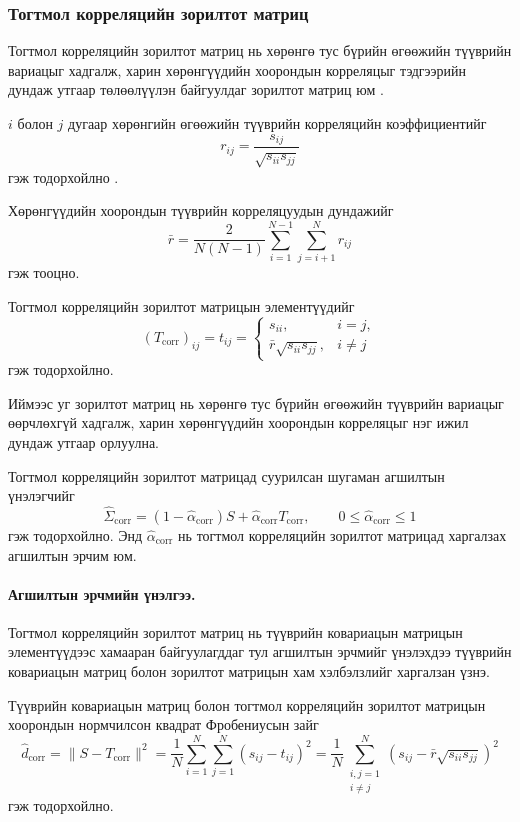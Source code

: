 \subsubsection{Тогтмол корреляцийн зорилтот матриц}

Тогтмол корреляцийн зорилтот матриц нь хөрөнгө тус бүрийн
өгөөжийн түүврийн вариацыг хадгалж, харин хөрөнгүүдийн
хоорондын корреляцыг тэдгээрийн дундаж утгаар
төлөөлүүлэн байгуулдаг зорилтот матриц юм
\citep{ledoitwolf2004a}.

$i$ болон $j$ дугаар хөрөнгийн өгөөжийн
түүврийн корреляцийн коэффициентийг
\[
r_{ij}
=
\frac{s_{ij}}{\sqrt{s_{ii}s_{jj}}}
\]
гэж тодорхойлно \citep{ledoitwolf2004a}.

Хөрөнгүүдийн хоорондын түүврийн
корреляцуудын дундажийг
\[
\bar r
=
\frac{2}{N(N-1)}
\sum_{i=1}^{N-1}
\sum_{j=i+1}^{N}r_{ij}
\]
гэж тооцно.

Тогтмол корреляцийн зорилтот матрицын
элементүүдийг
\[
(T_{\mathrm{corr}})_{ij}
=
t_{ij}
=
\begin{cases}
	s_{ii}, & i=j,\\
	\bar r\sqrt{s_{ii}s_{jj}}, & i\neq j
\end{cases}
\]
гэж тодорхойлно.

Иймээс уг зорилтот матриц нь хөрөнгө тус бүрийн
өгөөжийн түүврийн вариацыг өөрчлөхгүй хадгалж,
харин хөрөнгүүдийн хоорондын корреляцыг
нэг ижил дундаж утгаар орлуулна.

Тогтмол корреляцийн зорилтот матрицад
суурилсан шугаман агшилтын үнэлэгчийг
\[
\widehat{\Sigma}_{\mathrm{corr}}
=
(1-\widehat{\alpha}_{\mathrm{corr}})S
+
\widehat{\alpha}_{\mathrm{corr}}T_{\mathrm{corr}},
\qquad
0\leq\widehat{\alpha}_{\mathrm{corr}}\leq1
\]
гэж тодорхойлно. Энд
$\widehat{\alpha}_{\mathrm{corr}}$ нь тогтмол
корреляцийн зорилтот матрицад харгалзах
агшилтын эрчим юм.

\paragraph{Агшилтын эрчмийн үнэлгээ.}

Тогтмол корреляцийн зорилтот матриц нь
түүврийн ковариацын матрицын элементүүдээс
хамааран байгуулагддаг тул агшилтын
эрчмийг үнэлэхдээ түүврийн ковариацын
матриц болон зорилтот матрицын
хам хэлбэлзлийг харгалзан үзнэ.

Түүврийн ковариацын матриц болон
тогтмол корреляцийн зорилтот матрицын
хоорондын нормчилсон квадрат
Фробениусын зайг
\[
\widehat d_{\mathrm{corr}}
=
\|S-T_{\mathrm{corr}}\|^2
=
\frac{1}{N}
\sum_{i=1}^{N}\sum_{j=1}^{N}
(s_{ij}-t_{ij})^2
=
\frac{1}{N}
\sum_{\substack{i,j=1\\i\neq j}}^{N}
\left(
s_{ij}-\bar r\sqrt{s_{ii}s_{jj}}
\right)^2
\]
гэж тодорхойлно.


